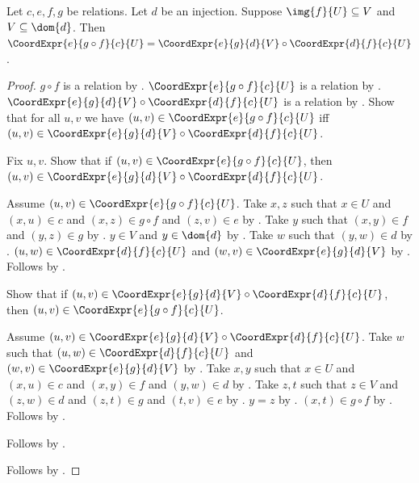 \begin{theorem}\label{coordinate_expression_composition}
    Let $c,e,f,g$ be relations.
    Let $d$ be an injection.
    Suppose $\img{f}{U}\subseteq V$ and $V\subseteq\dom{d}$.
    Then $\CoordExpr{e}{g\circ f}{c}{U}
        =\CoordExpr{e}{g}{d}{V}\circ\CoordExpr{d}{f}{c}{U}$.
\end{theorem}
\begin{proof}
    $g\circ f$ is a relation by .
    $\CoordExpr{e}{g\circ f}{c}{U}$ is a relation by
        .
    $\CoordExpr{e}{g}{d}{V}\circ\CoordExpr{d}{f}{c}{U}$ is a relation by
        .
    Show that for all $u,v$ we have $(u,v)\in\CoordExpr{e}{g\circ f}{c}{U}$ iff
        $(u,v)\in\CoordExpr{e}{g}{d}{V}\circ\CoordExpr{d}{f}{c}{U}$.
    \begin{subproof}
        Fix $u,v$.
        Show that if $(u,v)\in\CoordExpr{e}{g\circ f}{c}{U}$, then
            $(u,v)\in\CoordExpr{e}{g}{d}{V}\circ\CoordExpr{d}{f}{c}{U}$.
        \begin{subproof}
            Assume $(u,v)\in\CoordExpr{e}{g\circ f}{c}{U}$.
            Take $x,z$ such that $x\in U$ and $(x,u)\in c$ and
                $(x,z)\in g\circ f$ and $(z,v)\in e$ by .
            Take $y$ such that $(x,y)\in f$ and $(y,z)\in g$ by .
            $y\in V$ and $y\in\dom{d}$ by .
            Take $w$ such that $(y,w)\in d$ by .
            $(u,w)\in\CoordExpr{d}{f}{c}{U}$ and
                $(w,v)\in\CoordExpr{e}{g}{d}{V}$ by .
            Follows by .
        \end{subproof}
        Show that if $(u,v)\in\CoordExpr{e}{g}{d}{V}\circ\CoordExpr{d}{f}{c}{U}$, then
            $(u,v)\in\CoordExpr{e}{g\circ f}{c}{U}$.
        \begin{subproof}
            Assume $(u,v)\in\CoordExpr{e}{g}{d}{V}\circ\CoordExpr{d}{f}{c}{U}$.
            Take $w$ such that $(u,w)\in\CoordExpr{d}{f}{c}{U}$ and
                $(w,v)\in\CoordExpr{e}{g}{d}{V}$ by .
            Take $x,y$ such that $x\in U$ and $(x,u)\in c$ and
                $(x,y)\in f$ and $(y,w)\in d$ by .
            Take $z,t$ such that $z\in V$ and $(z,w)\in d$ and
                $(z,t)\in g$ and $(t,v)\in e$ by .
            $y=z$ by .
            $(x,t)\in g\circ f$ by .
            Follows by .
        \end{subproof}
        Follows by \auto.
    \end{subproof}
    Follows by .
\end{proof}

